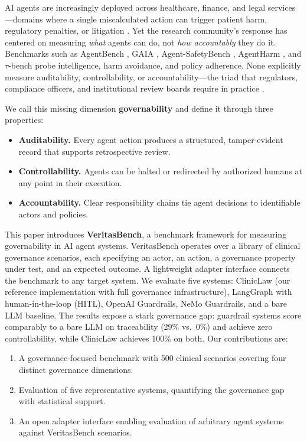 \documentclass{article}
\begin{document}
AI agents are increasingly deployed across healthcare, finance, and legal
services---domains where a single miscalculated action can trigger patient harm,
regulatory penalties, or litigation \cite{dwivedi2021ai}. Yet the research
community's response has centered on measuring \emph{what} agents can do, not
\emph{how accountably} they do it. Benchmarks such as AgentBench
\cite{liu2023agentbench}, GAIA \cite{mialon2023gaia},
Agent-SafetyBench \cite{zhang2024agentsafetybench}, AgentHarm
\cite{liao2024agentharm}, and $\tau$-bench \cite{yao2024taubench} probe
intelligence, harm avoidance, and policy adherence. None explicitly measure
auditability, controllability, or accountability---the triad that regulators,
compliance officers, and institutional review boards require in practice
\cite{floridi2018ai4people, nist2023airmf}.

We call this missing dimension \textbf{governability} and define it through
three properties:
\begin{itemize}\setlength\itemsep{1pt}
  \item \textbf{Auditability.} Every agent action produces a structured,
    tamper-evident record that supports retrospective review.
  \item \textbf{Controllability.} Agents can be halted or redirected by
    authorized humans at any point in their execution.
  \item \textbf{Accountability.} Clear responsibility chains tie agent decisions
    to identifiable actors and policies.
\end{itemize}

This paper introduces \textbf{VeritasBench}, a benchmark framework for
measuring governability in AI agent systems. VeritasBench operates over a
library of clinical governance scenarios, each specifying an actor, an action,
a governance property under test, and an expected outcome. A lightweight adapter
interface connects the benchmark to any target system. We evaluate five systems:
ClinicLaw (our reference implementation with full governance infrastructure),
LangGraph with human-in-the-loop (HITL), OpenAI Guardrails, NeMo Guardrails,
and a bare LLM baseline. The results expose a stark governance gap: guardrail
systems score comparably to a bare LLM on traceability (29\% vs.\ 0\%) and
achieve zero controllability, while ClinicLaw achieves 100\% on both. Our
contributions are:

\begin{enumerate}\setlength\itemsep{1pt}
  \item A governance-focused benchmark with 500 clinical scenarios covering four
    distinct governance dimensions.
  \item Evaluation of five representative systems, quantifying the governance
    gap with statistical support.
  \item An open adapter interface enabling evaluation of arbitrary agent systems
    against VeritasBench scenarios.
\end{enumerate}
\end{document}
